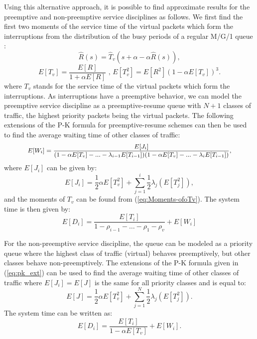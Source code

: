 \documentclass[11pt,journal,oneside,onecolumn,draftclsnofoot]{IEEEtran}
\begin{document}
Using this alternative approach, it is possible to find approximate results for the preemptive and non-preemptive service disciplines as follows.
We first find the first two moments of the service time of the virtual packets which form the interruptions from the distribution of the busy periods of a regular M/G/1 queue \cite{takagi91}: 
\begin{equation}
\widehat{R}(s)=\widehat{T}_v(s+\alpha-\alpha\widehat{R}(s)),
\label{eq:}
\end{equation}
\begin{equation}
E[T_v]=\frac{E[R]}{1+\alpha E[R]} \mbox { ,  } E[T^2_v]=E[R^2] (1-\alpha E[T_v])^3.
\label{eq:Moments-ofoTv}
\end{equation}
where $T_v$ stands for the service time of the virtual packets which form the interruptions.
As interruptions have a preemptive behavior, we can model the preemptive service discipline as a preemptive-resume queue with $N+1$ classes of traffic, the highest priority packets being the virtual packets.
The following extensions of the P-K formula for preemptive-resume schemes \cite{takagi91} can then be used to find the average waiting time of other classes of traffic:
\begin{equation}
\small
\begin{split}
E[W_i]= \frac{E[J_i]}{(1-\alpha{E[T_v]}-...-\lambda_{i-1} E[T_{i-1}])(1-\alpha{E[T_v]}-...-\lambda_i E[T_{i-1}])},
\label{eq:pk_ext}
\end{split}
\normalsize
\end{equation}
where $E[J_i]$ can be given by:
\begin{equation}
E[J_i]= \frac{1}{2} \alpha E[T_v^2]+ \sum_{j=1}^{i}{\frac{1}{2} \lambda_j(E[T_j^2])},
\label{eq:}
\end{equation}
and the moments of $T_v$ can be found from (\ref{eq:Moments-ofoTv}).
The system time is then given by:
\begin{equation}
E[D_i]=\frac{E[T_i]}{1-\rho_{i-1}-\dots-\rho_1-\rho_v}+E[W_i]
\end{equation}

For the non-preemptive service discipline, the queue can be modeled as a priority queue where the highest class of traffic (virtual) behaves preemptively, but other classes behave non-preemptively.  The extensions of the P-K formula given in (\ref{eq:pk_ext}) can be used to find the average waiting time of other classes of traffic where $E[J_i]=E[J]$ is the same for all priority classes and is equal to:
\begin{equation}
E[J]= \frac{1}{2} \alpha E[T_v^2]+ \sum_{j=1}^{N}{\frac{1}{2} \lambda_j(E[T_j^2])}.
\label{eq:}
\end{equation}
The system time can be written as: 
\begin{equation}
E[D_i]= \frac{E[T_i]}{1-\alpha{E[T_v]}}+E[W_i].
\label{eq:}
\end{equation}
\end{document}
